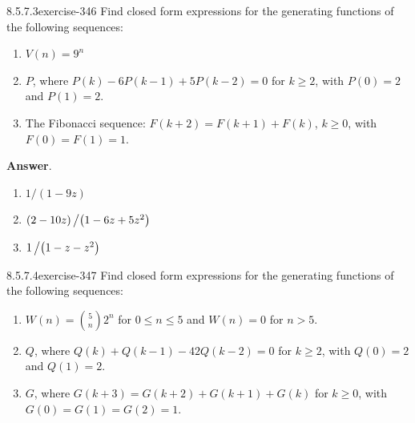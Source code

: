 \documentclass[twoside,10pt,]{book}
\numberwithin{equation}{section}
\begin{document}
\begin{divisionsolution}{8.5.7.3}{}{exercise-346}%
\hypertarget{p-2967}{}%
Find closed form expressions for the generating functions of the following sequences:%
\par
\hypertarget{p-2968}{}%
\leavevmode%
\begin{enumerate}[label=(\alph*)]
\item\hypertarget{li-1449}{}\hypertarget{p-2969}{}%
\(V(n) = 9^n\)%
\item\hypertarget{li-1450}{}\hypertarget{p-2970}{}%
\(P\), where \(P(k) - 6 P(k - 1) + 5 P(k - 2) = 0\) for \(k \geq  2\), with \(P(0) = 2\) and \(P(1) = 2\).%
\item\hypertarget{li-1451}{}\hypertarget{p-2971}{}%
The Fibonacci sequence: \(F(k + 2) = F(k + 1) + F(k)\), \(k \geq  0\), with \(F(0) = F(1) = 1\).%
\end{enumerate}
%
\par\smallskip%
\noindent\textbf{Answer}.\quad%
\hypertarget{p-2972}{}%
\leavevmode%
\begin{enumerate}[label=(\alph*)]
\item\hypertarget{li-1452}{}\hypertarget{p-2973}{}%
\(1/(1-9z)\)%
\item\hypertarget{li-1453}{}\hypertarget{p-2974}{}%
\((2-10z)\left/\left(1-6z+5z^2\right)\right.\)%
\item\hypertarget{li-1454}{}\hypertarget{p-2975}{}%
\(1\left/\left(1-z-z^2\right)\right.\)%
\end{enumerate}
%
\end{divisionsolution}%
\begin{divisionsolution}{8.5.7.4}{}{exercise-347}%
\hypertarget{p-2976}{}%
Find closed form expressions for the generating functions of the following sequences:%
\par
\hypertarget{p-2977}{}%
\leavevmode%
\begin{enumerate}[label=(\alph*)]
\item\hypertarget{li-1455}{}\hypertarget{p-2978}{}%
\(W(n) = \binom{5}{n} 2^n\) for \(0 \leq  n \leq  5\) and \(W(n) = 0\) for \(n > 5\).%
\item\hypertarget{li-1456}{}\hypertarget{p-2979}{}%
\(Q\), where \(Q(k) + Q(k - 1) - 42Q(k - 2) = 0\) for \(k\geq 2\), with \(Q(0) = 2\) and \(Q(1) = 2\).%
\item\hypertarget{li-1457}{}\hypertarget{p-2980}{}%
\(G\), where \(G(k + 3) = G(k + 2) + G(k + 1) + G(k)\) for \(k \geq  0\), with \(G(0) = G(1) = G(2) = 1\).%
\end{enumerate}
%
\end{divisionsolution}%
\end{document}
